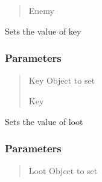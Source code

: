 \documentclass[letterpaper,10pt,english]{sphinxmanual}
\begin{document}
\begin{fulllineitems}
\begin{fulllineitems}
\begin{quote}
\begin{description}
\sphinxAtStartPar
Enemy

\end{description}\end{quote}

\end{fulllineitems}


\begin{fulllineitems}
\label{\detokenize{api_reference/dungeon_gui/Room:Room.Room.set_key}}
\pysigstartsignatures
{}
\pysigstopsignatures
\sphinxAtStartPar
Sets the value of key


\subsubsection{Parameters}
\label{\detokenize{api_reference/dungeon_gui/Room:id2}}\begin{quote}\begin{description}
\sphinxAtStartPar
Key Object to set

\sphinxAtStartPar
Key

\end{description}\end{quote}

\end{fulllineitems}


\begin{fulllineitems}
\label{\detokenize{api_reference/dungeon_gui/Room:Room.Room.set_loot}}
\pysigstartsignatures
{}
\pysigstopsignatures
\sphinxAtStartPar
Sets the value of loot


\subsubsection{Parameters}
\label{\detokenize{api_reference/dungeon_gui/Room:id3}}\begin{quote}\begin{description}
\sphinxAtStartPar
Loot Object to set


\end{description}
\end{quote}
\end{fulllineitems}
\end{fulllineitems}
\end{document}
